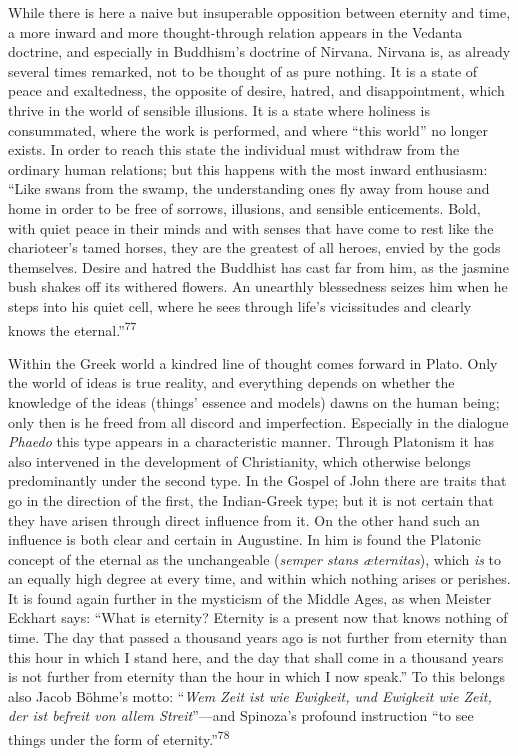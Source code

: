 \documentclass[12pt,a4paper]{book}
\newcommand{\opage}[1]{\marginnote{\footnotesize\textit{[#1]}}}
\begin{document}
While there is here a naive but insuperable opposition between eternity and time, a more inward and
more thought-through relation appears in the Vedanta doctrine, and especially in Buddhism's doctrine
of Nirvana. Nirvana is, as already several times remarked, not to be thought of as pure nothing. It
is a state of peace and exaltedness, the opposite of desire, hatred, and disappointment, which thrive
in the world of sensible illusions. It is a state where holiness is consummated, where the work is
performed, and where ``this world'' no longer exists. In order to reach this state the individual must
withdraw from the ordinary human relations; but this happens with the most inward enthusiasm: ``Like
swans from the swamp, the 
\opage{156}understanding ones fly away from house and home in order to be free of
sorrows, illusions, and sensible enticements. Bold, with quiet peace in their minds and with senses
that have come to rest like the charioteer's tamed horses, they are the greatest of all heroes, envied
by the gods themselves. Desire and hatred the Buddhist has cast far from him, as the jasmine bush
shakes off its withered flowers. An unearthly blessedness seizes him when he steps into his quiet
cell, where he sees through life's vicissitudes and clearly knows the eternal.''\textsuperscript{77}

Within the Greek world a kindred line of thought comes forward in Plato. Only the world of ideas is
true reality, and everything depends on whether the knowledge of the ideas (things' essence and
models) dawns on the human being; only then is he freed from all discord and imperfection. Especially
in the dialogue \emph{Phaedo} this type appears in a characteristic manner. Through Platonism it has
also intervened in the development of Christianity, which otherwise belongs predominantly under the
second type. In the Gospel of John there are traits that go in the direction of the first, the
Indian-Greek type; but it is not certain that they have arisen through direct influence from it. On
the other hand such an influence is both clear and certain in Augustine. In him is found the Platonic
concept of the eternal as the unchangeable (\textit{semper stans æternitas}), which \emph{is} to an
equally high degree at every time, and within which nothing arises or perishes. It is found again
further in the mysticism of the Middle Ages, as when Meister Eckhart says: ``What is eternity?
Eternity is a present now that knows nothing of time. The day that passed a thousand years ago is not
further from eternity than this hour in which I stand here, and the day that shall come in a thousand
years is not further from eternity than the hour in which I now speak.'' To this belongs also Jacob
Böhme's motto: ``\textit{Wem Zeit ist wie Ewigkeit, und Ewigkeit wie Zeit, der ist befreit von allem
Streit}''---and Spinoza's profound instruction ``to see things under the form of
eternity.''\textsuperscript{78}
\end{document}
